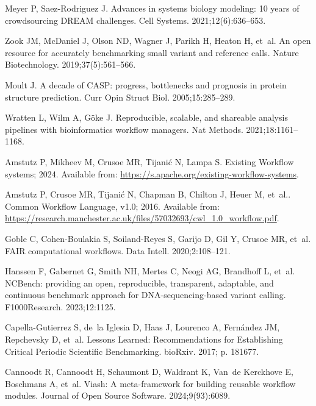 \documentclass[11pt]{article}
\begin{document}
\begin{thebibliography}{10}
Meyer P, Saez-Rodriguez J.
\newblock Advances in systems biology modeling: 10 years of crowdsourcing DREAM
  challenges.
\newblock Cell Systems. 2021;12(6):636--653.

Zook JM, McDaniel J, Olson ND, Wagner J, Parikh H, Heaton H, et~al.
\newblock An open resource for accurately benchmarking small variant and
  reference calls.
\newblock Nature Biotechnology. 2019;37(5):561--566.

Moult J.
\newblock A decade of {CASP}: progress, bottlenecks and prognosis in protein
  structure prediction.
\newblock Curr Opin Struct Biol. 2005;15:285--289.

Wratten L, Wilm A, Göke J.
\newblock Reproducible, scalable, and shareable analysis pipelines with
  bioinformatics workflow managers.
\newblock Nat Methods. 2021;18:1161--1168.

Amstutz P, Mikheev M, Crusoe MR, Tijanić N, Lampa S. Existing Workflow
  systems; 2024.
\newblock Available from: \url{https://s.apache.org/existing-workflow-systems}.

Amstutz P, Crusoe MR, Tijanić N, Chapman B, Chilton J, Heuer M, et~al.. Common
  Workflow Language, {v1}.0; 2016.
\newblock Available from:
  \url{https://research.manchester.ac.uk/files/57032693/cwl_1.0_workflow.pdf}.

Goble C, Cohen-Boulakia S, Soiland-Reyes S, Garijo D, Gil Y, Crusoe MR, et~al.
\newblock FAIR computational workflows.
\newblock Data Intell. 2020;2:108--121.

Hanssen F, Gabernet G, Smith NH, Mertes C, Neogi AG, Brandhoff L, et~al.
\newblock NCBench: providing an open, reproducible, transparent, adaptable, and
  continuous benchmark approach for {DNA}-sequencing-based variant calling.
\newblock F1000Research. 2023;12:1125.

Capella-Gutierrez S, de~la Iglesia D, Haas J, Lourenco A, Fernández JM,
  Repchevsky D, et~al.
\newblock Lessons Learned: Recommendations for Establishing Critical Periodic
  Scientific Benchmarking.
\newblock bioRxiv. 2017; p. 181677.

Cannoodt R, Cannoodt H, Schaumont D, Waldrant K, Van~de Kerckhove E, Boschmans
  A, et~al.
\newblock Viash: A meta-framework for building reusable workflow modules.
\newblock Journal of Open Source Software. 2024;9(93):6089.


\end{thebibliography}
\end{document}
